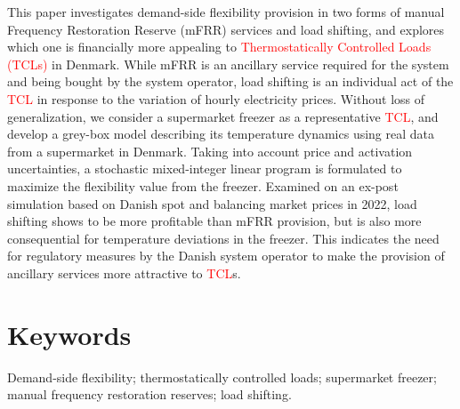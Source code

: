 \documentclass[11pt,a4paper]{article}
\begin{document}
This paper investigates %
demand-side flexibility provision in two  forms of manual Frequency Restoration Reserve (mFRR) services and load shifting, and explores which one is financially more appealing to \textcolor{red}{Thermostatically Controlled Loads (TCLs)} in Denmark. While mFRR is an ancillary service required for the system and being bought by the system operator, load shifting is an individual act of the \textcolor{red}{TCL} in response to the variation of hourly electricity prices.  %
Without loss of generalization, we consider a supermarket freezer  as a representative \textcolor{red}{TCL}, and develop a grey-box model  describing its temperature dynamics using real data from a supermarket in Denmark. Taking into account price and activation uncertainties, a stochastic mixed-integer linear program is formulated to maximize the flexibility value from the freezer. %
%
%
Examined on an ex-post simulation based on  Danish spot and balancing market prices in 2022, load shifting shows to be more profitable than mFRR provision, but is also more consequential for temperature deviations in the freezer. This indicates the need for regulatory measures by the Danish  system operator to make the provision of ancillary services more attractive to  \textcolor{red}{TCL}s. 

\section*{Keywords}

Demand-side flexibility; thermostatically controlled loads; supermarket freezer; manual frequency restoration reserves; load shifting.
\end{document}
